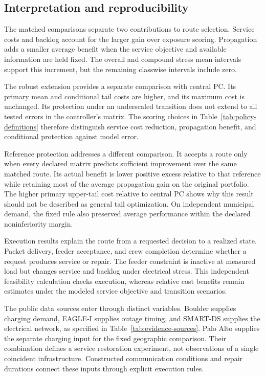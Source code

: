 \documentclass[journal]{IEEEtran}
\begin{document}
\subsection{Interpretation and reproducibility}
\label{sec:interpretation}

The matched comparisons separate two contributions to route selection.
Service costs and backlog account for the larger gain over exposure scoring.
Propagation adds a smaller average benefit when the service objective and
available information are held fixed.  The overall and compound stress mean
intervals support this increment, but the remaining classwise intervals
include zero.

The robust extension provides a separate comparison with central PC.  Its
primary mean and conditional tail costs are higher, and its maximum cost is
unchanged.  Its protection under an underscaled transition does not extend to
all tested errors in the controller's matrix.  The scoring choices in
Table~\ref{tab:policy-definitions} therefore distinguish service cost reduction,
propagation benefit, and conditional protection against model error.

Reference protection addresses a different comparison.  It accepts a route
only when every declared matrix predicts sufficient improvement over the
same matched route.  Its actual benefit is lower positive excess relative
to that reference while retaining most of the average propagation gain on
the original portfolio.  The higher primary upper-tail cost relative to
central PC shows why this result should not be described as general tail
optimization.  On independent municipal demand, the fixed rule also
preserved average performance within the declared noninferiority margin.

Execution results explain the route from a requested decision to a realized
state.  Packet delivery, feeder acceptance, and crew completion determine
whether a request produces service or repair.  The feeder constraint is
inactive at measured load but changes service and backlog under electrical
stress.  This independent feasibility calculation checks execution, whereas
relative cost benefits remain estimates under the modeled service objective
and transition scenarios.

The public data sources enter through distinct variables.  Boulder
supplies charging demand, EAGLE-I supplies outage timing, and SMART-DS supplies
the electrical network, as specified in Table~\ref{tab:evidence-sources}.
Palo Alto supplies the separate charging input for the fixed geographic
comparison.  Their combination defines a service restoration experiment,
not observations of a single coincident infrastructure.  Constructed
communication conditions and repair durations connect these inputs through
explicit execution rules.
\end{document}
